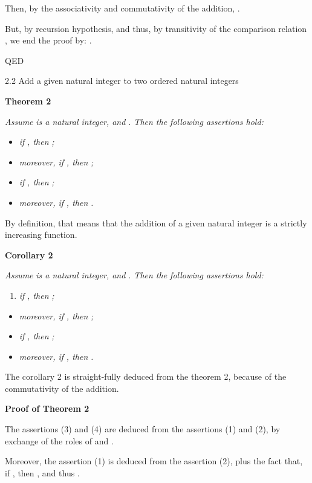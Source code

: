 \documentclass{article}
\providecommand{\tightlist}{%
  \setlength{\itemsep}{0pt}\setlength{\parskip}{0pt}}
\begin{document}
Then, by the associativity and commutativity of the addition, .

But, by recursion hypothesis,  and thus, by transitivity of the comparison relation , we end the proof by: .

QED

2.2 Add a given natural integer to two ordered natural integers

\textbf{Theorem 2}

\emph{Assume }\emph{ is a natural integer, and }\emph{. Then the following assertions hold:}

\begin{itemize}
\tightlist
\item \emph{if }\emph{, then }\emph{;}
\item \emph{moreover, if }\emph{, then }\emph{;}
\item \emph{if }\emph{, then }\emph{;}
\item \emph{moreover, if }\emph{, then }\emph{.}
\end{itemize}

By definition, that means that the addition of a given natural integer is a strictly increasing function.



\textbf{Corollary 2}

\emph{Assume }\emph{ is a natural integer, and }\emph{. Then the following assertions hold:}

\begin{enumerate}
\tightlist
\item \emph{if }\emph{, then }\emph{;}
\end{enumerate}

\begin{itemize}
\tightlist
\item \emph{moreover, if }\emph{, then }\emph{;}
\item \emph{if }\emph{, then }\emph{;}
\item \emph{moreover, if }\emph{, then }\emph{.}
\end{itemize}

The corollary 2 is straight-fully deduced from the theorem 2, because of the commutativity of the addition.

\textbf{Proof of Theorem 2}

The assertions (3) and (4) are deduced from the assertions (1) and (2), by exchange of the roles of  and .

Moreover, the assertion (1) is deduced from the assertion (2), plus the fact that, if , then , and thus .
\end{document}
